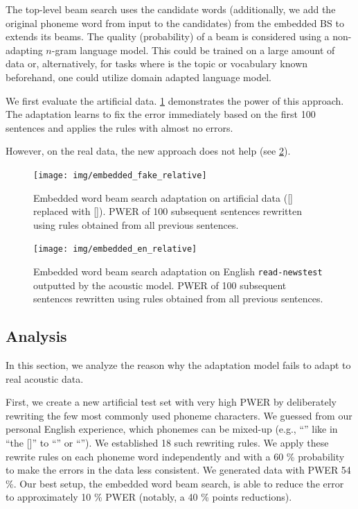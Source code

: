 The top-level beam search uses the candidate words (additionally, we add the original phoneme word from input to the candidates) from the embedded BS to extends its beams. The quality (probability) of a beam is considered using a non-adapting $n$-gram language model. This could be trained on a large amount of data or, alternatively, for tasks where is the topic or vocabulary known beforehand, one could utilize domain adapted language model. 

We first evaluate the artificial data. \cref{fig:embedded} demonstrates the power of this approach. The adaptation learns to fix the error immediately based on the first 100 sentences and applies the rules with almost no errors.

However, on the real data, the new approach does not help (see \cref{fig:embedded_en}). 

\begin{figure}[h]
    \texttt{[image: img/embedded\_fake\_relative]}
    \caption[Embedded word beam search  adaptation on artificial data]{Embedded word beam search  adaptation on artificial data ([] replaced with []). PWER of 100 subsequent sentences rewritten using rules obtained from all previous sentences.}
    \label{fig:embedded} 
\end{figure}

\begin{figure}[h]
    \texttt{[image: img/embedded\_en\_relative]}
    \caption[Embedded word beam search adaptation on English]{Embedded word beam search adaptation on English \texttt{read-newstest} outputted by the acoustic model. PWER of 100 subsequent sentences rewritten using rules obtained from all previous sentences.}
    \label{fig:embedded_en} 
\end{figure}


\subsection{Analysis}
In this section, we analyze the reason why the adaptation model fails to adapt to real acoustic data.

First, we create a new artificial test set with very high PWER by deliberately rewriting the few most commonly used phoneme characters. We guessed from our personal English experience, which phonemes can be mixed-up (e.g., ``'' like in ``the []'' to ``'' or ``''). We established 18 such rewriting rules. We apply these rewrite rules on each phoneme word independently and with a 60 \% probability to make the errors in the data less consistent. We generated data with PWER 54 \%. Our best setup, the embedded word beam search, is able to reduce the error to approximately 10 \% PWER (notably, a 40 \% points reductions).  

